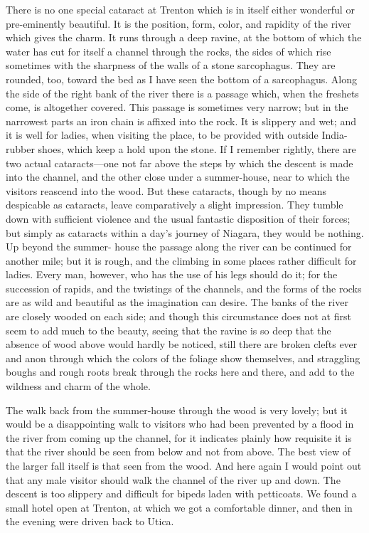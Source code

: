 There is no one special cataract at Trenton which is in itself
either wonderful or pre-eminently beautiful.  It is the position,
form, color, and rapidity of the river which gives the charm.  It
runs through a deep ravine, at the bottom of which the water has
cut for itself a channel through the rocks, the sides of which rise
sometimes with the sharpness of the walls of a stone sarcophagus.
They are rounded, too, toward the bed as I have seen the bottom of
a sarcophagus.  Along the side of the right bank of the river there
is a passage which, when the freshets come, is altogether covered.
This passage is sometimes very narrow; but in the narrowest parts
an iron chain is affixed into the rock.  It is slippery and wet;
and it is well for ladies, when visiting the place, to be provided
with outside India-rubber shoes, which keep a hold upon the stone.
If I remember rightly, there are two actual cataracts---one not far
above the steps by which the descent is made into the channel, and
the other close under a summer-house, near to which the visitors
reascend into the wood.  But these cataracts, though by no means
despicable as cataracts, leave comparatively a slight impression.
They tumble down with sufficient violence and the usual fantastic
disposition of their forces; but simply as cataracts within a day's
journey of Niagara, they would be nothing.  Up beyond the summer-
house the passage along the river can be continued for another
mile; but it is rough, and the climbing in some places rather
difficult for ladies.  Every man, however, who has the use of his
legs should do it; for the succession of rapids, and the twistings
of the channels, and the forms of the rocks are as wild and
beautiful as the imagination can desire.  The banks of the river
are closely wooded on each side; and though this circumstance does
not at first seem to add much to the beauty, seeing that the ravine
is so deep that the absence of wood above would hardly be noticed,
still there are broken clefts ever and anon through which the
colors of the foliage show themselves, and straggling boughs and
rough roots break through the rocks here and there, and add to the
wildness and charm of the whole.

The walk back from the summer-house through the wood is very
lovely; but it would be a disappointing walk to visitors who had
been prevented by a flood in the river from coming up the channel,
for it indicates plainly how requisite it is that the river should
be seen from below and not from above.  The best view of the larger
fall itself is that seen from the wood.  And here again I would
point out that any male visitor should walk the channel of the
river up and down.  The descent is too slippery and difficult for
bipeds laden with petticoats.  We found a small hotel open at
Trenton, at which we got a comfortable dinner, and then in the
evening were driven back to Utica.

